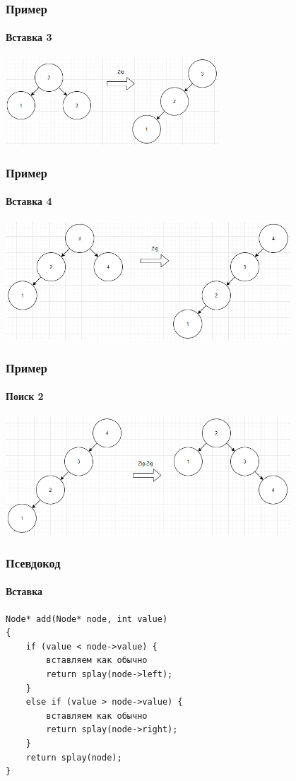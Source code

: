 \documentclass{../../slides-style}
\begin{document}
    \begin{frame}
        \frametitle{Пример}
        \framesubtitle{Вставка 3}
        \begin{center}
            \includegraphics[width=0.6\textwidth]{splay3.png}
        \end{center}
    \end{frame}

    \begin{frame}
        \frametitle{Пример}
        \framesubtitle{Вставка 4}
        \begin{center}
            \includegraphics[width=0.8\textwidth]{splay4.png}
        \end{center}
    \end{frame}

    \begin{frame}
        \frametitle{Пример}
        \framesubtitle{Поиск 2}
        \begin{center}
            \includegraphics[width=0.8\textwidth]{splaySearch.png}
        \end{center}
    \end{frame}

    \begin{frame}[fragile]
        \frametitle{Псевдокод}
        \framesubtitle{Вставка}
        \begin{verbatim}
Node* add(Node* node, int value)
{
    if (value < node->value) {
        вставляем как обычно
        return splay(node->left);
    }
    else if (value > node->value) {
        вставляем как обычно
        return splay(node->right);
    }
    return splay(node);
}
        \end{verbatim}
    \end{frame}
\end{document}
